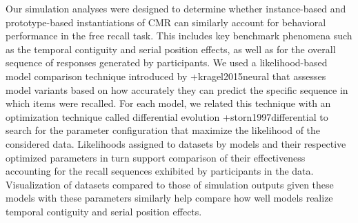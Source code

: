 \markdownRendererInterblockSeparator
{}Our simulation analyses were designed to determine whether instance-based and prototype-based instantiations of CMR can similarly account for behavioral performance in the free recall task. This includes key benchmark phenomena such as the temporal contiguity and serial position effects, as well as for the overall sequence of responses generated by participants. We used a likelihood-based model comparison technique introduced by +{}{}{kragel2015neural} that assesses model variants based on how accurately they can predict the specific sequence in which items were recalled. For each model, we related this technique with an optimization technique called differential evolution +{}{}{storn1997differential} to search for the parameter configuration that maximize the likelihood of the considered data. Likelihoods assigned to datasets by models and their respective optimized parameters in turn support comparison of their effectiveness accounting for the recall sequences exhibited by participants in the data. Visualization of datasets compared to those of simulation outputs given these models with these parameters similarly help compare how well models realize temporal contiguity and serial position effects.\relax